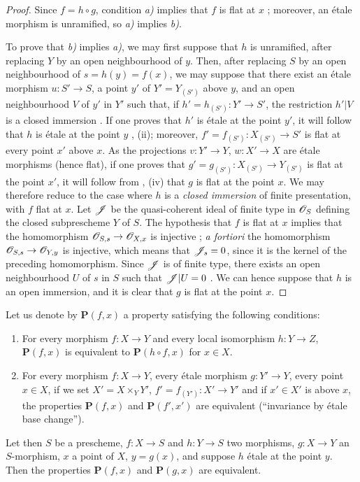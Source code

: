 \begin{proof}
Since $f=h\circ g$, condition \emph{a)} implies that $f$ is flat at $x$ ; moreover, an \'etale morphism is unramified, so \emph{a)} implies \emph{b)}.

To prove that \emph{b)} implies \emph{a)}, we may first suppose that $h$ is unramified, after replacing $Y$ by an open neighbourhood of $y$.
Then, after replacing $S$ by an open neighbourhood of $s=h(y)=f(x)$, we may suppose that there exist an \'etale morphism $u:S'\to S$, a point $y'$ of $Y'=Y_{(S')}$ above $y$, and an open neighbourhood $V$ of $y'$ in $Y'$ such that, if $h'=h_{(S')}:Y'\to S'$, the restriction $h'|V$ is a closed immersion .
If one proves that $h'$ is \'etale at the point $y'$, it will follow that $h$ is \'etale at the point $y$ , (ii);
moreover, $f'=f_{(S')}:X_{(S')}\to S'$ is flat at every point $x'$ above $x$.
As the projections $v:Y'\to Y$, $w:X'\to X$ are \'etale morphisms (hence flat), if one proves that $g'=g_{(S')}:X_{(S')}\to Y_{(S')}$ is flat at the point $x'$, it will follow from , (iv) that $g$ is flat at the point $x$.
We may therefore reduce to the case where $h$ is a \emph{closed immersion}
of finite presentation, with $f$ flat at $x$.
Let $\mathscr{J}$ be the quasi-coherent ideal of finite type in $\mathscr{O}_S$ defining the closed subprescheme $Y$ of $S$.
The hypothesis that $f$ is flat at $x$ implies that the homomorphism $\mathscr{O}_{S,s}\to\mathscr{O}_{X,x}$ is injective ;
\emph{a fortiori} the homomorphism $\mathscr{O}_{S,s}\to\mathscr{O}_{Y,y}$ is injective, which means that $\mathscr{J}_s=0$, since it is the kernel of the preceding homomorphism.
Since $\mathscr{J}$ is of finite type, there exists an open neighbourhood $U$ of $s$ in $S$ such that $\mathscr{J}|U=0$ .
We can hence suppose that $h$ is an open immersion, and it is clear that $g$ is flat at the point $x$.
\end{proof}

\begin{proposition}[18.4.10]
\label{IV.18.4.10}
Let us denote by $\boldsymbol{P}(f,x)$ a property satisfying the following conditions:
\begin{enumerate}
  \item[$1^\circ$] For every morphism $f:X\to Y$ and every local isomorphism $h:Y\to Z$, $\boldsymbol{P}(f,x)$ is equivalent to $\boldsymbol{P}(h\circ f,x)$ for $x\in X$.
  \item[$2^\circ$] For every morphism $f:X\to Y$, every \'etale morphism $g:Y'\to Y$, every point $x\in X$, if we set $X'=X\times_Y Y'$, $f'=f_{(Y')}:X'\to Y'$ and if $x'\in X'$ is above $x$, the properties $\boldsymbol{P}(f,x)$ and $\boldsymbol{P}(f',x')$ are equivalent \textup{(``invariance by \'etale base change'')}.
\end{enumerate}
Let then $S$ be a prescheme, $f:X\to S$ and $h:Y\to S$ two morphisms, $g:X\to Y$ an $S$-morphism, $x$ a point of $X$, $y=g(x)$, and suppose $h$ \'etale at the point $y$.
Then the properties $\boldsymbol{P}(f,x)$ and $\boldsymbol{P}(g,x)$ are equivalent.
\end{proposition}

